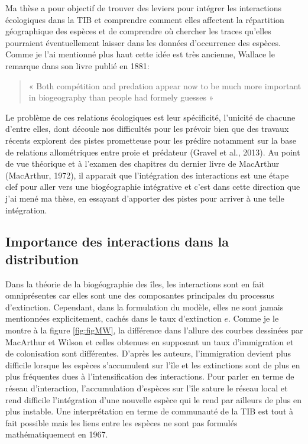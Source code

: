 Ma thèse a pour objectif de trouver des leviers pour intégrer les
interactions écologiques dans la TIB et comprendre comment elles
affectent la répartition géographique des espèces et de comprendre où
chercher les traces qu'elles pourraient éventuellement laisser dans les
données d'occurrence des espèces. Comme je l'ai mentionné plus haut
cette idée est très ancienne, Wallace le remarque dans son livre publié
en 1881:

\begin{quote}
« Both compétition and predation appear now to be much more important in
biogeography than people had formely guesses »
\end{quote}

Le problème de ces relations écologiques est leur spécificité, l'unicité
de chacune d'entre elles, dont découle nos difficultés pour les prévoir
bien que des travaux récents explorent des pistes prometteuse pour les
prédire notamment sur la base de relations allométriques entre proie et
prédateur (Gravel et al., 2013). Au point de vue théorique et à l'examen
des chapitres du dernier livre de MacArthur (MacArthur, 1972), il
apparait que l'intégration des interactions est une étape clef pour
aller vers une biogéographie intégrative et c'est dans cette direction
que j'ai mené ma thèse, en essayant d'apporter des pistes pour arriver à
une telle intégration.

\subsection*{Importance des interactions dans la
distribution}\label{importance-des-interactions-dans-la-distribution}

Dans la théorie de la biogéographie des îles, les interactions sont en
fait omniprésentes car elles sont une des composantes principales du
processus d'extinction. Cependant, dans la formulation du modèle, elles
ne sont jamais mentionnées explicitement, cachés dans le taux
d'extinction \(e\). Comme je le montre à la figure \ref{fig:figMW}, la
différence dans l'allure des courbes dessinées par MacArthur et Wilson
et celles obtenues en supposant un taux d'immigration et de colonisation
sont différentes. D'après les auteurs, l'immigration devient plus
difficile lorsque les espèces s'accumulent sur l'île et les extinctions
sont de plus en plus fréquentes dues à l'intensification des
interactions. Pour parler en terme de réseau d'interaction,
l'accumulation d'espèces sur l'île sature le réseau local et rend
difficile l'intégration d'une nouvelle espèce qui le rend par ailleurs
de plus en plus instable. Une interprétation en terme de communauté de
la TIB est tout à fait possible mais les liens entre les espèces ne sont
pas formulés mathématiquement en 1967.

